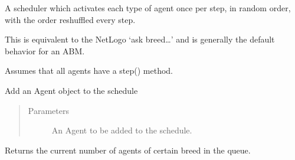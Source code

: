 \documentclass[letterpaper,10pt,english]{sphinxmanual}
\begin{document}
\label{\detokenize{index:module-examples.wolf_sheep.wolf_sheep.schedule}}

\begin{fulllineitems}
\label{\detokenize{index:examples.wolf_sheep.wolf_sheep.schedule.RandomActivationByBreed}}
A scheduler which activates each type of agent once per step, in random
order, with the order reshuffled every step.

This is equivalent to the NetLogo ‘ask breed…’ and is generally the
default behavior for an ABM.

Assumes that all agents have a step() method.

\begin{fulllineitems}
\label{\detokenize{index:examples.wolf_sheep.wolf_sheep.schedule.RandomActivationByBreed.add}}
Add an Agent object to the schedule
\begin{quote}\begin{description}
\item[{Parameters}] \leavevmode
{} \textendash{} An Agent to be added to the schedule.

\end{description}\end{quote}

\end{fulllineitems}


\begin{fulllineitems}
\label{\detokenize{index:examples.wolf_sheep.wolf_sheep.schedule.RandomActivationByBreed.get_breed_count}}
Returns the current number of agents of certain breed in the queue.


\end{fulllineitems}
\end{fulllineitems}
\end{document}
